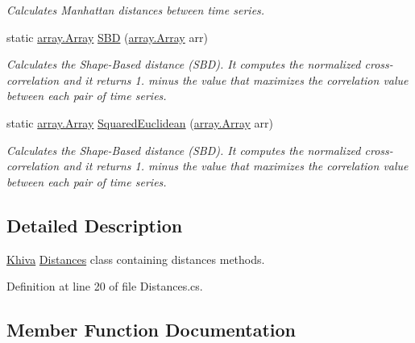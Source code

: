 \begin{DoxyCompactItemize}
\begin{DoxyCompactList}\small\item\em Calculates Manhattan distances between time series. \end{DoxyCompactList}\item 
static \mbox{\hyperlink{classkhiva_1_1array_1_1_array}{array.\+Array}} \mbox{\hyperlink{classkhiva_1_1distances_1_1_distances_a5047a6e83a2e870929ab537e328dc306}{S\+BD}} (\mbox{\hyperlink{classkhiva_1_1array_1_1_array}{array.\+Array}} arr)
\begin{DoxyCompactList}\small\item\em Calculates the Shape-\/\+Based distance (S\+BD). It computes the normalized cross-\/correlation and it returns 1. minus the value that maximizes the correlation value between each pair of time series. \end{DoxyCompactList}\item 
static \mbox{\hyperlink{classkhiva_1_1array_1_1_array}{array.\+Array}} \mbox{\hyperlink{classkhiva_1_1distances_1_1_distances_addaafe2d58ec05fbe00e7cbfbe5eef6c}{Squared\+Euclidean}} (\mbox{\hyperlink{classkhiva_1_1array_1_1_array}{array.\+Array}} arr)
\begin{DoxyCompactList}\small\item\em Calculates the Shape-\/\+Based distance (S\+BD). It computes the normalized cross-\/correlation and it returns 1. minus the value that maximizes the correlation value between each pair of time series. \end{DoxyCompactList}\end{DoxyCompactItemize}


\subsection{Detailed Description}
\mbox{\hyperlink{classkhiva_1_1_khiva}{Khiva}} \mbox{\hyperlink{classkhiva_1_1distances_1_1_distances}{Distances}} class containing distances methods. 



Definition at line 20 of file Distances.\+cs.



\subsection{Member Function Documentation}
\mbox{\label{classkhiva_1_1distances_1_1_distances_a851cefe60d2daa550bbd3b1e75b9de7a}} 
